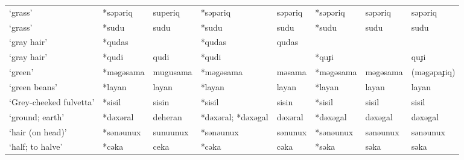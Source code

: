 \begin{landscape}
\begin{longtable}[c]{@{}p{3cm}<{\raggedright}p{2.75cm}<{\raggedright}p{2.75cm}<{\raggedright}p{2.75cm}<{\raggedright}p{2.75cm}<{\raggedright}p{2.75cm}<{\raggedright}p{2.75cm}<{\raggedright}p{2.75cm}<{\raggedright}@{}}
`grass'                                              & *səpəriq           & superiq                        & *səpəriq           & səpəriq                    & *səpəriq         & səpəriq                  & səpəriq                           \\
`grass'                                              & *sudu              & sudu                           & *sudu              & sudu                       & *sudu            & sudu                     & sudu                              \\
`gray hair'                                          & *qudas             &                                & *qudas             & qudas                      &                  &                          &                                   \\
`gray hair'                                          & *qudi              & qudi                           & *qudi              &                            & *quɟi            &                          & quɟi                              \\
`green'                                              & *məgəsama          & mugusama                       & *məgəsama          & məsama                     & *məgəsama        & məgəsama                 & (məgəpaɟiq)                       \\
`green beans'                                        & *layan             & layan                          & *layan             & layan                      & *layan           & layan                    & layan                             \\
`Grey-cheeked fulvetta'                              & *sisil             & sisin                          & *sisil             & sisin                      & *sisil           & sisil                    & sisil                             \\
`ground; earth'                                      & *dəxəral           & deheran                        & *dəxəral; *dəxəgal & dəxəral                    & *dəxəgal         & dəxəgal                  & dəxəgal                           \\
`hair (on head)'                                     & *sənəunux          & sunuunux                       & *sənəunux          & sənunux                    & *sənəunux        & sənəunux                 & sənəunux                          \\
`half; to halve'                                     & *cəka              & ceka                           & *cəka              & cəka                       & *səka            & səka                     & səka                              \\

\end{longtable}
\end{landscape}

